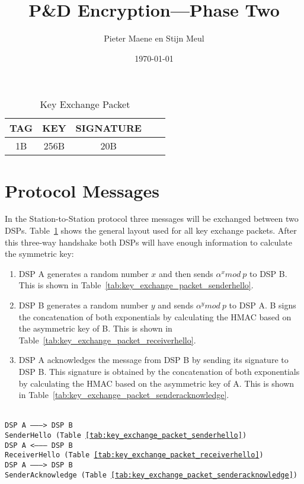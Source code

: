 \documentclass[a4paper]{article}
\title{P\&D Encryption---Phase Two}
\author{Pieter Maene en Stijn Meul}
\date{\today}
\begin{document}
\maketitle

\begin{table}[H]
    \begin{center}
        \begin{tabular}{| c | c | c | c | c |}
            \hline
            TAG & KEY & SIGNATURE \\ \hline
            1B & 256B & 20B \\
            \hline
        \end{tabular}
    \end{center}
    
    \caption{Key Exchange Packet}
    \label{tab:key_exchange_packet}
\end{table}

\section{Protocol Messages}
In the Station-to-Station protocol three messages will be exchanged between two DSPs. Table~\ref{tab:key_exchange_packet} shows the general layout used for all key exchange packets. After this three-way handshake both DSPs will have enough information to calculate the symmetric key:

\begin{enumerate}
 \item DSP A generates a random number $x$ and then sends $\alpha^x mod\ p$ to DSP B. This is shown in Table~\ref{tab:key_exchange_packet_senderhello}.
 \item DSP B generates a random number $y$ and sends $\alpha^y mod\ p$ to DSP A. B signs the concatenation of both exponentials by calculating the HMAC based on the asymmetric key of B. This is shown in Table~\ref{tab:key_exchange_packet_receiverhello}.
 \item DSP A acknowledges the message from DSP B by sending its signature to DSP B. This signature is obtained by the concatenation of both exponentials by calculating the HMAC based on the asymmetric key of A. This is shown in Table~\ref{tab:key_exchange_packet_senderacknowledge}.
\end{enumerate}
\begin{center}
  \texttt{ \\
  DSP A ---------> DSP B\\
  SenderHello (Table~\ref{tab:key_exchange_packet_senderhello})\\
  DSP A <--------- DSP B\\
  ReceiverHello (Table~\ref{tab:key_exchange_packet_receiverhello})\\
  DSP A ---------> DSP B\\
  SenderAcknowledge (Table~\ref{tab:key_exchange_packet_senderacknowledge})\\
  }
\end{center}
\end{document}
